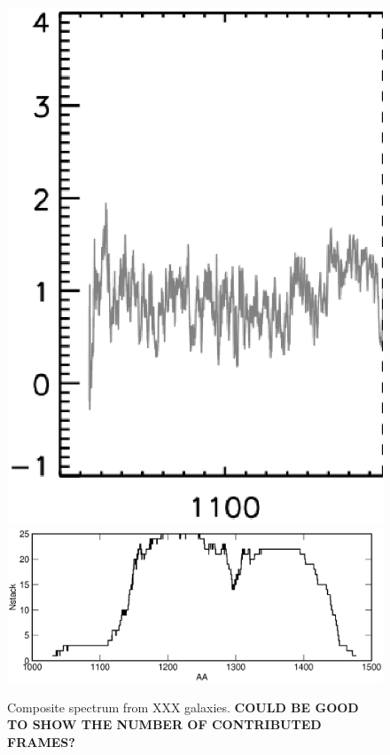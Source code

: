 \documentclass[manuscript]{emulateapj}
\newcommand{\lya}{Ly$\alpha$}
\begin{document}

\begin{figure}[t!]
   \centering
   \includegraphics[scale=.5]{stack.ps}
   \includegraphics[scale=.6]{Nstack.eps}
   \caption{Composite spectrum from XXX galaxies. {\bf COULD BE GOOD TO SHOW THE NUMBER OF CONTRIBUTED FRAMES?}}
   \label{fig:stack}
\end{figure}
\end{document}
